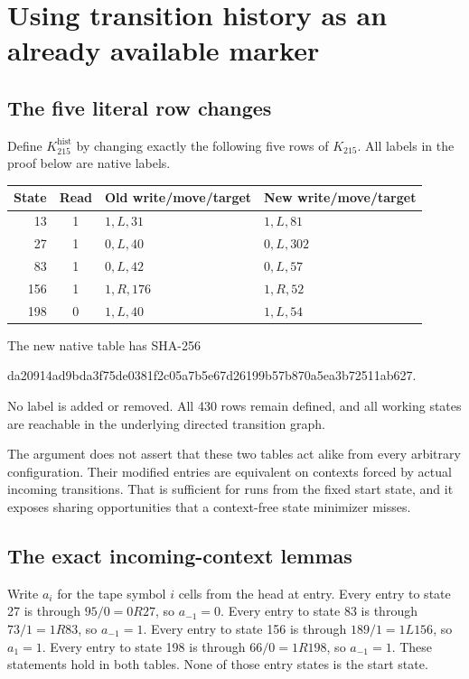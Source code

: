 \documentclass[11pt]{article}
\theoremstyle{definition}
\newcommand{\Kbase}{K_{215}}
\newcommand{\Kctx}{K_{215}^{\mathrm{hist}}}
\begin{document}
\section{Using transition history as an already available marker}
\label{sec:returns}

\subsection{The five literal row changes}

Define \(\Kctx\) by changing exactly the following five rows of \(\Kbase\).
All labels in the proof below are native labels.
\begin{center}
\begin{tabular}{@{}rcll@{}}
\toprule
State & Read & Old write/move/target & New write/move/target\\
\midrule
13  & 1 & \(1,L,31\)   & \(1,L,81\)\\
27  & 1 & \(0,L,40\)   & \(0,L,302\)\\
83  & 1 & \(0,L,42\)   & \(0,L,57\)\\
156 & 1 & \(1,R,176\)  & \(1,R,52\)\\
198 & 0 & \(1,L,40\)   & \(1,L,54\)\\
\bottomrule
\end{tabular}
\end{center}
The new native table has SHA-256
\begin{center}\footnotesize\ttfamily
da20914ad9bda3f75de0381f2c05a7b5e67d26199b57b870a5ea3b72511ab627.
\end{center}
No label is added or removed. All 430 rows remain defined, and all working
states are reachable in the underlying directed transition graph.

The argument does not assert that these two tables act alike from every
arbitrary configuration. Their modified entries are equivalent on contexts
forced by actual incoming transitions. That is sufficient for runs from
the fixed start state, and it exposes sharing opportunities that a
context-free state minimizer misses.

\subsection{The exact incoming-context lemmas}

Write \(a_i\) for the tape symbol \(i\) cells from the head at entry.
Every entry to state 27 is through \(95/0=0R27\), so \(a_{-1}=0\).
Every entry to state 83 is through \(73/1=1R83\), so \(a_{-1}=1\).
Every entry to state 156 is through \(189/1=1L156\), so \(a_{1}=1\).
Every entry to state 198 is through \(66/0=1R198\), so \(a_{-1}=1\).
These statements hold in both tables. None of those entry states is the
start state.
\end{document}

